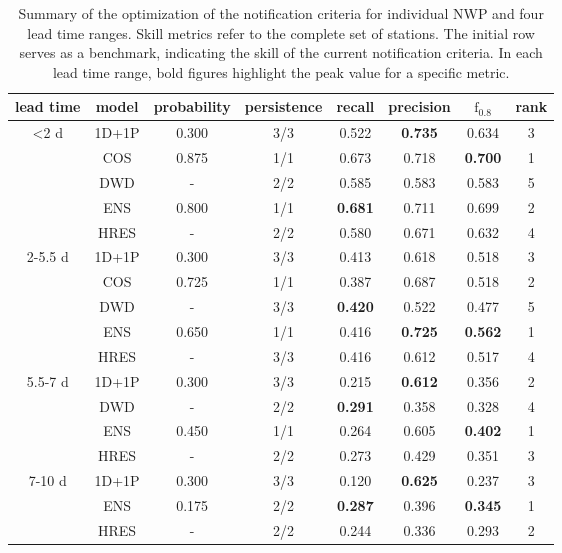 \documentclass[preprint,12pt,authoryear]{elsarticle}
\begin{document}
\begin{table}
    \centering
    \caption{Summary of the optimization of the notification criteria for individual NWP and four lead time ranges. Skill metrics refer to the complete set of stations.  The initial row serves as a benchmark, indicating the skill of the current notification criteria. In each lead time range, bold figures highlight the peak value for a specific metric.}
    \footnotesize
    \begin{tabular}{cccccccc}
        \toprule
        lead time & model & probability & persistence & recall & precision & $\text{f}_{0.8}$ & rank \\
        \midrule
        \textless 2 d & 1D+1P & 0.300& 3/3 & 0.522 & \textbf{0.735} & 0.634 & 3 \\
         & COS & 0.875 & 1/1 & 0.673 & 0.718 & \textbf{0.700} & 1 \\
         & DWD & - & 2/2 & 0.585 & 0.583 & 0.583 & 5 \\
         & ENS& 0.800 & 1/1 & \textbf{0.681} & 0.711 & 0.699 & 2\\
         & HRES& -& 2/2 & 0.580 & 0.671 & 0.632 & 4\\
         \midrule
        2-5.5 d & 1D+1P & 0.300& 3/3 & 0.413 & 0.618 & 0.518 & 3 \\
         & COS & 0.725 & 1/1 & 0.387 & 0.687 & 0.518 & 2 \\
         & DWD & - & 3/3 & \textbf{0.420} & 0.522 & 0.477 & 5 \\
         & ENS & 0.650 & 1/1 & 0.416 & \textbf{0.725} & \textbf{0.562} & 1 \\
         & HRES & - & 3/3 & 0.416 & 0.612 & 0.517 & 4 \\
         \midrule
        5.5-7 d & 1D+1P & 0.300& 3/3 & 0.215 & \textbf{0.612} & 0.356 & 2 \\
         & DWD & - & 2/2 & \textbf{0.291} & 0.358 & 0.328 & 4 \\
         & ENS & 0.450 & 1/1 & 0.264 & 0.605 & \textbf{0.402} & 1 \\
         & HRES & - & 2/2 & 0.273 & 0.429 & 0.351 & 3 \\
         \midrule
        7-10 d & 1D+1P & 0.300& 3/3 & 0.120 & \textbf{0.625} & 0.237 & 3 \\
         & ENS & 0.175 & 2/2 & \textbf{0.287} & 0.396 & \textbf{0.345} & 1 \\
         & HRES & - & 2/2 & 0.244 & 0.336 & 0.293 & 2 \\
         \bottomrule
    \end{tabular}
    \label{tab:NWP_optimization}
\end{table}
\end{document}
